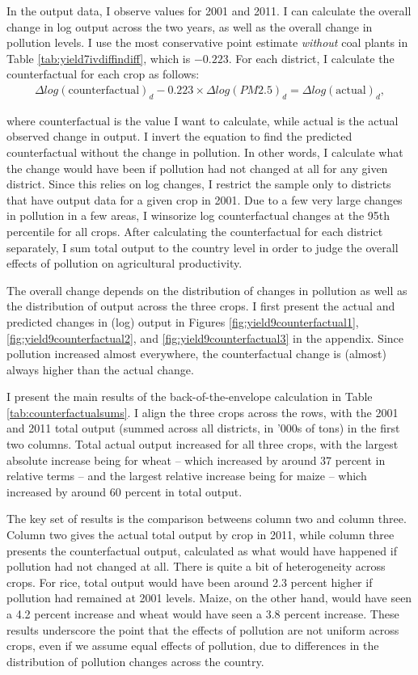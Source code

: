 \documentclass[
]{article}
\begin{document}
In the output data, I observe values for 2001 and 2011. I can calculate the overall change in log output across the two years, as well as the overall change in pollution levels. I use the most conservative point estimate \emph{without} coal plants in Table \ref{tab:yield7ivdiffindiff}, which is \(-0.223\). For each district, I calculate the counterfactual for each crop as follows:
\begin{gather} \label{eq:counterfactual} \Delta log(\mathrm{counterfactual})_{d}-0.223\times\Delta log(PM2.5)_{d} = \Delta log(\mathrm{actual})_{d}, \end{gather}

where \(\mathrm{counterfactual}\) is the value I want to calculate, while \(\mathrm{actual}\) is the actual observed change in output. I invert the equation to find the predicted counterfactual without the change in pollution. In other words, I calculate what the change would have been if pollution had not changed at all for any given district. Since this relies on log changes, I restrict the sample only to districts that have output data for a given crop in 2001. Due to a few very large changes in pollution in a few areas, I winsorize log counterfactual changes at the 95th percentile for all crops. After calculating the counterfactual for each district separately, I sum total output to the country level in order to judge the overall effects of pollution on agricultural productivity.

The overall change depends on the distribution of changes in pollution as well as the distribution of output across the three crops. I first present the actual and predicted changes in (log) output in Figures \ref{fig:yield9counterfactual1}, \ref{fig:yield9counterfactual2}, and \ref{fig:yield9counterfactual3} in the appendix. Since pollution increased almost everywhere, the counterfactual change is (almost) always higher than the actual change.

I present the main results of the back-of-the-envelope calculation in Table \ref{tab:counterfactualsums}. I align the three crops across the rows, with the 2001 and 2011 total output (summed across all districts, in '000s of tons) in the first two columns. Total actual output increased for all three crops, with the largest absolute increase being for wheat -- which increased by around 37 percent in relative terms -- and the largest relative increase being for maize -- which increased by around 60 percent in total output.

The key set of results is the comparison betweens column two and column three. Column two gives the actual total output by crop in 2011, while column three presents the counterfactual output, calculated as what would have happened if pollution had not changed at all. There is quite a bit of heterogeneity across crops. For rice, total output would have been around 2.3 percent higher if pollution had remained at 2001 levels. Maize, on the other hand, would have seen a 4.2 percent increase and wheat would have seen a 3.8 percent increase. These results underscore the point that the effects of pollution are not uniform across crops, even if we assume equal effects of pollution, due to differences in the distribution of pollution changes across the country.
\end{document}
